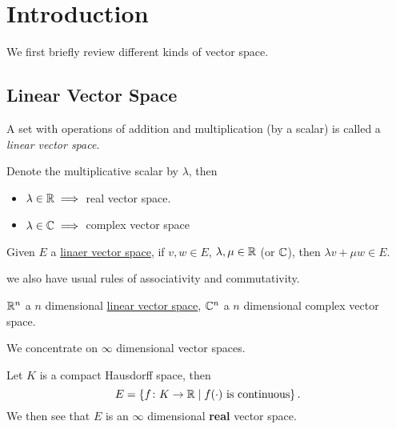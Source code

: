 \chapter{Introduction}

We first briefly review different kinds of vector space.

\section{Linear Vector Space}

\begin{definition}\label{def:linear-vector-space}
	A set with operations of addition and multiplication (by a scalar) is called a \emph{linear vector space}.
\end{definition}

\begin{eg}
	Denote the multiplicative scalar by \(\lambda \), then

	\begin{itemize}
		\item \(\lambda \in \mathbb{\MakeUppercase{r}} \implies\) real vector space.
		\item \(\lambda \in \mathbb{\MakeUppercase{c}} \implies \) complex vector space
	\end{itemize}
\end{eg}

\begin{lemma}
	Given \(E\) a \hyperref[def:linear-vector-space]{linaer vector space}, if \(v, w\in E\), \(\lambda , \mu \in \mathbb{\MakeUppercase{r}} \) (or \(\mathbb{\MakeUppercase{c}} \)), then \(\lambda v + \mu w\in E\).
\end{lemma}

we also have usual rules of associativity and commutativity.

\begin{eg}
	\(\mathbb{\MakeUppercase{r}} ^n\) a \(n\) dimensional \hyperref[def:linear-vector-space]{linear vector space}, \(\mathbb{\MakeUppercase{c}} ^n\) a \(n\) dimensional complex vector space.
\end{eg}

We concentrate on \(\infty \) dimensional vector spaces.

\begin{eg}
	Let \(K\) is a compact Hausdorff space, then
	\[
		E = \left\{ f\colon K\to \mathbb{\MakeUppercase{r}} \mid f(\cdot) \text{ is continuous}  \right\}.
	\]
	We then see that \(E\) is an \(\infty\)	dimensional \textbf{real} vector space.
\end{eg}

